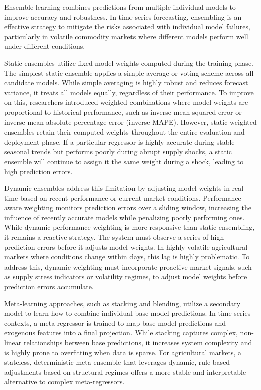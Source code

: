 \documentclass[12pt,a4paper]{report}
\theoremstyle{definition}
\theoremstyle{remark}
\begin{document}
Ensemble learning combines predictions from multiple individual models to improve accuracy and robustness. In time-series forecasting, ensembling is an effective strategy to mitigate the risks associated with individual model failures, particularly in volatile commodity markets where different models perform well under different conditions.

Static ensembles utilize fixed model weights computed during the training phase. The simplest static ensemble applies a simple average or voting scheme across all candidate models. While simple averaging is highly robust and reduces forecast variance, it treats all models equally, regardless of their performance. To improve on this, researchers introduced weighted combinations where model weights are proportional to historical performance, such as inverse mean squared error or inverse mean absolute percentage error (inverse-MAPE). However, static weighted ensembles retain their computed weights throughout the entire evaluation and deployment phase. If a particular regressor is highly accurate during stable seasonal trends but performs poorly during abrupt supply shocks, a static ensemble will continue to assign it the same weight during a shock, leading to high prediction errors.

Dynamic ensembles address this limitation by adjusting model weights in real time based on recent performance or current market conditions. Performance-aware weighting monitors prediction errors over a sliding window, increasing the influence of recently accurate models while penalizing poorly performing ones. While dynamic performance weighting is more responsive than static ensembling, it remains a reactive strategy. The system must observe a series of high prediction errors before it adjusts model weights. In highly volatile agricultural markets where conditions change within days, this lag is highly problematic. To address this, dynamic weighting must incorporate proactive market signals, such as supply stress indicators or volatility regimes, to adjust model weights before prediction errors accumulate.

Meta-learning approaches, such as stacking and blending, utilize a secondary model to learn how to combine individual base model predictions. In time-series contexts, a meta-regressor is trained to map base model predictions and exogenous features into a final projection. While stacking captures complex, non-linear relationships between base predictions, it increases system complexity and is highly prone to overfitting when data is sparse. For agricultural markets, a stateless, deterministic meta-ensemble that leverages dynamic, rule-based adjustments based on structural regimes offers a more stable and interpretable alternative to complex meta-regressors.
\end{document}
